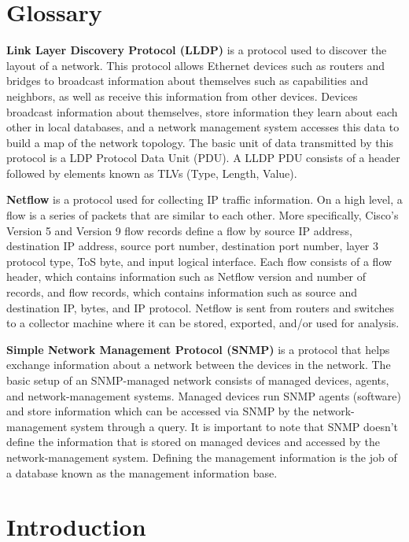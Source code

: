 \documentclass{sig-alternate}
\begin{document}
\section*{Glossary}

\textbf{Link Layer Discovery Protocol (LLDP)} is a protocol used to discover the
layout of a network.\cite{ExtremeNetLldp} This protocol allows Ethernet devices
such as routers and bridges to broadcast information about themselves such as
capabilities and neighbors, as well as receive this information from other
devices. Devices broadcast information about themselves, store information they
learn about each other in local databases, and a network management system
accesses this data to build a map of the network topology. The basic unit of
data transmitted by this protocol is a LDP Protocol Data Unit (PDU). A LLDP PDU
consists of a header followed by elements known as TLVs (Type, Length, Value).

\textbf{Netflow} is a protocol used for collecting IP
traffic information.\cite{SolarWindsGuide} On a high level, a flow is a series
of packets that are similar to each other. More specifically, Cisco’s Version 5
and Version 9 flow records define a flow by source IP address, destination IP
address, source port number, destination port number, layer 3 protocol type, ToS
byte, and input logical interface. Each flow consists of a flow header, which
contains information such as Netflow version and number of records, and flow
records, which contains information such as source and destination IP, bytes,
and IP protocol. Netflow is sent from routers and switches to a collector
machine where it can be stored, exported, and/or used for analysis.

\textbf{Simple Network Management Protocol (SNMP)} is a protocol that helps
exchange information about a network between the devices in the
network.\cite{ZohoSnmp} The basic setup of an SNMP-managed network consists of
managed devices, agents, and network-management systems. Managed devices run
SNMP agents (software) and store information which can be accessed via SNMP by
the network-management system through a query. It is important to note that SNMP
doesn’t define the information that is stored on managed devices and accessed by
the network-management system. Defining the management information is the job of
a database known as the management information base.

\section{Introduction}
\end{document}

